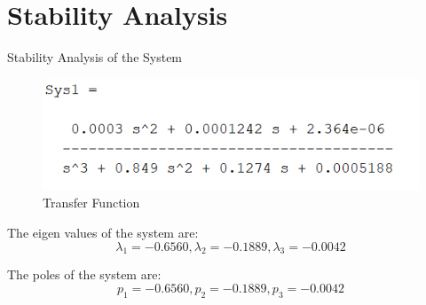\documentclass[10pt,compress,mathserif]{beamer}
\begin{document}
\section{Stability Analysis}
\begin{frame}{Stability Analysis of the System}

	\begin{figure}[h!]
		\centering
		\includegraphics[scale=0.65]{images/tf.png}
		\caption{Transfer Function}
	\end{figure}
	
The eigen values of the system are:
\begin{equation} \lambda_1 = -0.6560,  \lambda_2 = -0.1889, \lambda_3 = -0.0042 \end{equation}
   

The poles of the system are:
\begin{equation} p_1 = -0.6560,  p_2 = -0.1889, p_3 = -0.0042 \end{equation} \vskip10pt

\end{frame}

\end{document}
